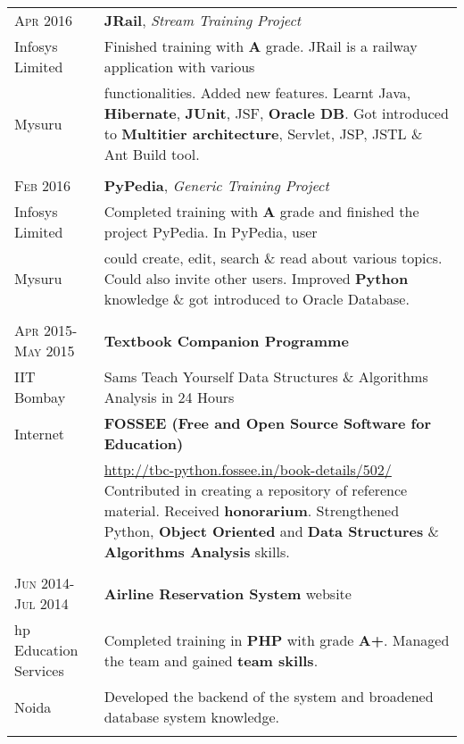 \documentclass[a4paper,10pt]{article} %
\begin{document}
\begin{tabular}{l|p{11cm}}

\textsc{Apr 2016} & \textbf{JRail}, \emph{Stream Training Project} \emph{}\\
Infosys Limited & \footnotesize{Finished training with \textbf{A} grade. JRail is a railway application with various}\\
Mysuru & \footnotesize{functionalities. Added new features. Learnt Java, \textbf{Hibernate}, \textbf{JUnit}, JSF, \textbf{Oracle DB}. Got introduced to \textbf{Multitier architecture}, Servlet, JSP, JSTL \& Ant Build tool.}\\
\multicolumn{2}{c}{} \\


\textsc{Feb 2016} & \textbf{PyPedia}, \emph{Generic Training Project} \emph{}\\
Infosys Limited & \footnotesize{Completed training with \textbf{A} grade and finished the project PyPedia. In PyPedia, user}\\
Mysuru & \footnotesize{could create, edit, search \& read about various topics. Could also invite other users. Improved \textbf{Python} knowledge \& got introduced to Oracle Database.}\\
\multicolumn{2}{c}{} \\


\textsc{Apr 2015-May 2015} & \textbf{Textbook Companion Programme} \emph{}\\
IIT Bombay & \footnotesize{Sams Teach Yourself Data Structures \& Algorithms Analysis in 24 Hours}\\
Internet & \footnotesize{\textbf{FOSSEE (Free and Open Source Software for Education)}}\\
& \footnotesize{\href{http://tbc-python.fossee.in/book-details/502/}{http://tbc-python.fossee.in/book-details/502/} Contributed in creating a repository of reference material. Received \textbf{honorarium}. Strengthened Python, \textbf{Object Oriented} and \textbf{Data Structures} \& \textbf{Algorithms Analysis} skills.}\\
\multicolumn{2}{c}{} \\


\textsc{Jun 2014-Jul 2014} & \textbf{Airline Reservation System} website \emph{}\\
hp Education Services & \footnotesize{Completed training in \textbf{PHP} with grade \textbf{A+}. Managed the team and gained \textbf{team skills}.}\\
Noida & \footnotesize{Developed the backend of the system and broadened database system knowledge.}\\
\multicolumn{2}{c}{} \\


\end{tabular}
\end{document}
